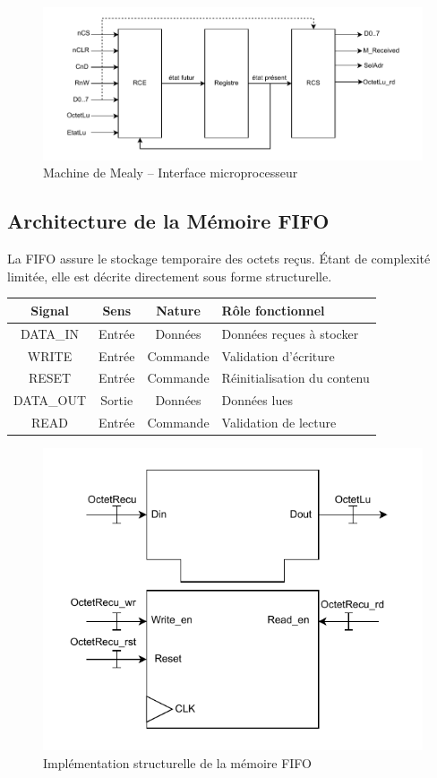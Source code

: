 \begin{figure}[H]
    \centering
    \includegraphics[width=0.8\linewidth]{images/inter/MEALY_Interface_Micro.pdf}
    \caption{Machine de Mealy – Interface microprocesseur}
    \label{fig:mealy_micro}
\end{figure}

\subsection{Architecture de la Mémoire FIFO}

La FIFO assure le stockage temporaire des octets reçus.  
Étant de complexité limitée, elle est décrite directement sous forme structurelle.

\begin{center}
\renewcommand{\arraystretch}{1.2}
\small
\begin{tabularx}{\textwidth}{|c||c|c|X|}
\hline
\textbf{Signal} & \textbf{Sens} & \textbf{Nature} & \textbf{Rôle fonctionnel} \\ \hline
DATA\_IN & Entrée & Données & Données reçues à stocker \\ 
WRITE & Entrée & Commande & Validation d’écriture \\ 
RESET & Entrée & Commande & Réinitialisation du contenu \\ 
DATA\_OUT & Sortie & Données & Données lues \\ 
READ & Entrée & Commande & Validation de lecture \\ 
\hline
\end{tabularx}
\end{center}

\begin{figure}[H]
    \centering
    \includegraphics[width=0.8\linewidth]{images/inter/Implementation_FIFO.pdf}
    \caption{Implémentation structurelle de la mémoire FIFO}
    \label{fig:fifo}
\end{figure}


